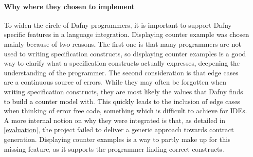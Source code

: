 \paragraph{Why where they chosen to implement}
To widen the circle of Dafny programmers, it is important to support Dafny specific features in a language integration. Displaying counter example was chosen mainly because of two reasons. The first one is that many programmers are not used to writing specification constructs, so displaying counter examples is a good way to clarify what a specification constructs actually expresses, deepening the understanding of the programmer. \newline
The second consideration is that edge cases are a continuous source of errors. While they may often be forgotten when writing specification constructs, they are most likely the values that Dafny finds to build a counter model with. This quickly leads to the inclusion of edge cases when thinking of error free code, something which is difficult to achieve for IDEs. \newline
A more internal notion on why they were integrated is that, as detailed in \ref{evaluation}, the project failed to deliver a generic approach towards contract generation. Displaying counter examples is a way to partly make up for this missing feature, as it supports the programmer finding correct constructs. 
